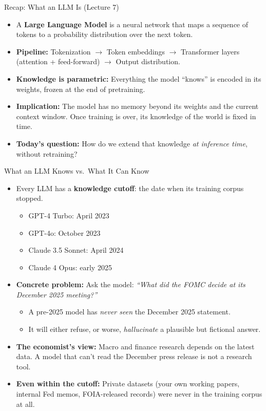 \documentclass[10pt,english,aspectratio=169]{beamer}
\begin{document}
\begin{frame}{Recap: What an LLM Is (Lecture 7)}
\begin{itemize}
\item A \textbf{Large Language Model} is a neural network that maps a sequence of tokens to a probability distribution over the next token.

\medskip
\item \textbf{Pipeline:} Tokenization $\to$ Token embeddings $\to$ Transformer layers (attention + feed-forward) $\to$ Output distribution.

\medskip
\item \textbf{Knowledge is parametric:} Everything the model ``knows'' is encoded in its weights, frozen at the end of pretraining.

\medskip
\item \textbf{Implication:} The model has no memory beyond its weights and the current context window. Once training is over, its knowledge of the world is fixed in time.

\medskip
\item \textbf{Today's question:} How do we extend that knowledge \emph{at inference time}, without retraining?
\end{itemize}
\end{frame}

\begin{frame}{What an LLM Knows vs.\ What It Can Know}
\begin{itemize}
\item Every LLM has a \textbf{knowledge cutoff}: the date when its training corpus stopped.
\begin{itemize}
    \item GPT-4 Turbo: April 2023
    \item GPT-4o: October 2023
    \item Claude 3.5 Sonnet: April 2024
    \item Claude 4 Opus: early 2025
\end{itemize}

\medskip
\item \textbf{Concrete problem:} Ask the model: \emph{``What did the FOMC decide at its December 2025 meeting?''}
\begin{itemize}
    \item A pre-2025 model has \emph{never seen} the December 2025 statement.
    \item It will either refuse, or worse, \emph{hallucinate} a plausible but fictional answer.
\end{itemize}

\medskip
\item \textbf{The economist's view:} Macro and finance research depends on the latest data. A model that can't read the December press release is not a research tool.

\medskip
\item \textbf{Even within the cutoff:} Private datasets (your own working papers, internal Fed memos, FOIA-released records) were never in the training corpus at all.
\end{itemize}
\end{frame}
\end{document}
